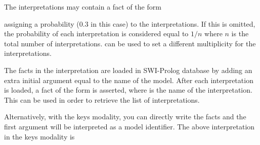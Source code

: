 \documentclass[letterpaper,10pt,english]{sphinxmanual}
\begin{document}
\begin{sphinxVerbatim}[commandchars=\\\{\}]
\end{sphinxVerbatim}

The interpretations may contain a fact of the form

\begin{sphinxVerbatim}[commandchars=\\\{\}]
\end{sphinxVerbatim}

assigning a probability (0.3 in this case) to the interpretations.
If this is omitted, the probability of each interpretation is considered equal to \(1/n\) where \(n\) is the total number of interpretations.  can be used to set a different multiplicity for the interpretations.

The facts in the interpretation are loaded in SWI-Prolog database by adding an extra initial argument equal to the name of the model.
After each interpretation is loaded, a fact of the form  is asserted, where  is the name of the interpretation.
This can be used in order to retrieve the list of interpretations.

Alternatively, with the keys modality, you can directly write the facts and the first argument will be interpreted as a model identifier.
The above interpretation in the keys modality is
\end{document}
